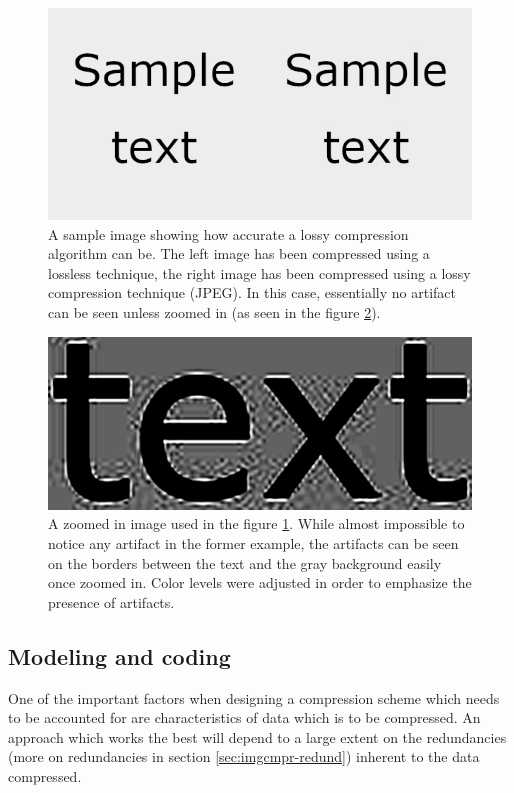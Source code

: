 \documentclass[thesis=M,english]{FITthesis}[2012/10/20]
\begin{document}
\begin{figure}[h]
  \centering
  \includegraphics{imgs/sampletext-comparison}
  \caption[Accuracy of JPEG]{A sample image showing how accurate a lossy compression algorithm can be. The left image
           has been compressed using a lossless technique, the right image has been
           compressed using a lossy compression technique (JPEG). In this case, essentially
           no artifact can be seen unless zoomed in (as seen in the figure \ref{fig:jfifartifact}).}
  \label{fig:jfifvspng-sample}
\end{figure}

\begin{figure}[h]
  \centering
  \includegraphics[scale=0.3]{imgs/text-artifacts}
  \caption[JPEG artifacts in an image containing text]{A zoomed in image used in the figure \ref{fig:jfifvspng-sample}. While
           almost impossible to notice any artifact in the former example,
           the artifacts can be seen on the borders between the text and the
           gray background easily once zoomed in. Color levels were adjusted
           in order to emphasize the presence of artifacts.}
  \label{fig:jfifartifact}
\end{figure}


\subsection{Modeling and coding}
One of the important factors when designing a compression scheme which needs to
be accounted for are characteristics of data which is to be compressed. An approach
which works the best will depend to a large extent on the redundancies (more on
redundancies in section \ref{sec:imgcmpr-redund}) inherent to the data compressed.
\end{document}
